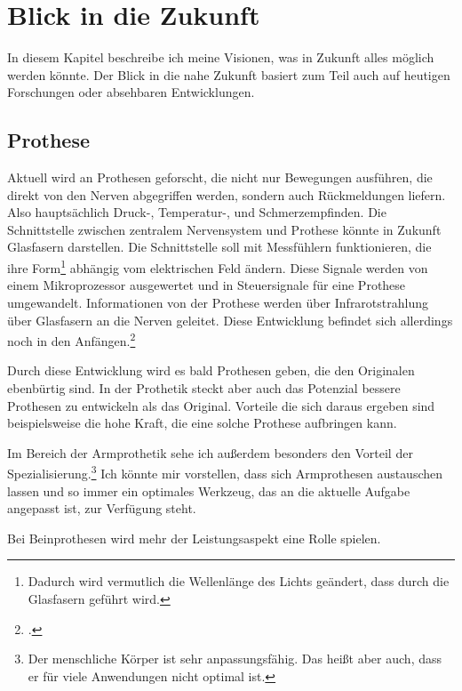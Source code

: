 \section{Blick in die Zukunft}
\label{sec:Robin:future}

In diesem Kapitel beschreibe ich meine Visionen, was in Zukunft alles möglich werden könnte. Der Blick in
die nahe Zukunft basiert zum Teil auch auf heutigen Forschungen oder absehbaren Entwicklungen.

\subsection{Prothese}
Aktuell wird an Prothesen geforscht, die nicht nur Bewegungen ausführen, die direkt von den Nerven
abgegriffen werden, sondern auch Rückmeldungen liefern. Also hauptsächlich \mbox{Druck-,}
\mbox{Temperatur-,} und
Schmerzempfinden. Die Schnittstelle zwischen zentralem Nervensystem und Prothese könnte in Zukunft
Glasfasern darstellen. Die Schnittstelle soll mit Messfühlern funktionieren, die ihre
Form\footnote{Dadurch wird vermutlich die Wellenlänge des Lichts geändert, dass durch die Glasfasern
geführt wird.} abhängig vom elektrischen Feld ändern. Diese Signale werden von einem Mikroprozessor
ausgewertet und in Steuersignale für eine Prothese umgewandelt.
Informationen von der Prothese werden über Infrarotstrahlung über Glasfasern an die Nerven geleitet.
Diese Entwicklung befindet sich allerdings noch in den
Anfängen.\footcite{Spektrum:Weg_zu_intelligenten_Prothesen}

Durch diese Entwicklung wird es bald Prothesen geben, die den Originalen ebenbürtig sind. In der
Prothetik steckt aber auch das Potenzial bessere Prothesen zu entwickeln als das Original. Vorteile
die sich daraus ergeben sind beispielsweise die hohe Kraft, die eine solche Prothese aufbringen kann.

Im Bereich der Armprothetik sehe ich außerdem besonders den Vorteil der Spezialisierung.\footnote{Der
menschliche Körper ist sehr anpassungsfähig.
Das heißt aber auch, dass er für viele Anwendungen nicht
optimal ist.} Ich könnte mir vorstellen, dass sich Armprothesen austauschen lassen und so immer ein
optimales Werkzeug, das an die aktuelle Aufgabe angepasst ist, zur Verfügung steht.

Bei Beinprothesen wird mehr der Leistungsaspekt eine Rolle spielen.


